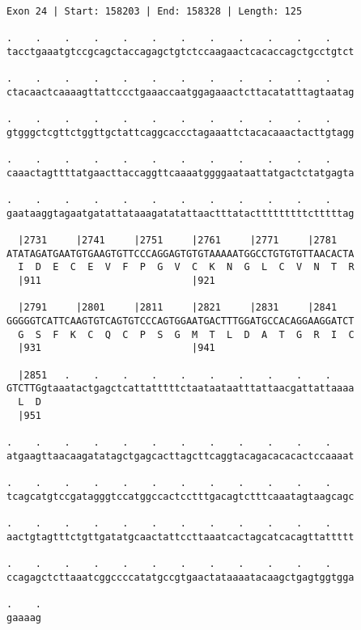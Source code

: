 \documentclass{article}
\begin{document}
\begin{Verbatim}[fontfamily=courier]
Exon 24 | Start: 158203 | End: 158328 | Length: 125

.    .    .    .    .    .    .    .    .    .    .    .    
tacctgaaatgtccgcagctaccagagctgtctccaagaactcacaccagctgcctgtct

.    .    .    .    .    .    .    .    .    .    .    .    
ctacaactcaaaagttattccctgaaaccaatggagaaactcttacatatttagtaatag

.    .    .    .    .    .    .    .    .    .    .    .    
gtgggctcgttctggttgctattcaggcaccctagaaattctacacaaactacttgtagg

.    .    .    .    .    .    .    .    .    .    .    .    
caaactagttttatgaacttaccaggttcaaaatggggaataattatgactctatgagta

.    .    .    .    .    .    .    .    .    .    .    .    
gaataaggtagaatgatattataaagatatattaactttatactttttttttctttttag

  |2731     |2741     |2751     |2761     |2771     |2781   
ATATAGATGAATGTGAAGTGTTCCCAGGAGTGTGTAAAAATGGCCTGTGTGTTAACACTA
  I  D  E  C  E  V  F  P  G  V  C  K  N  G  L  C  V  N  T  R
  |911                          |921                        

  |2791     |2801     |2811     |2821     |2831     |2841   
GGGGGTCATTCAAGTGTCAGTGTCCCAGTGGAATGACTTTGGATGCCACAGGAAGGATCT
  G  S  F  K  C  Q  C  P  S  G  M  T  L  D  A  T  G  R  I  C
  |931                          |941                        

  |2851   .    .    .    .    .    .    .    .    .    .    
GTCTTGgtaaatactgagctcattatttttctaataataatttattaacgattattaaaa
  L  D                                                      
  |951                                                      

.    .    .    .    .    .    .    .    .    .    .    .    
atgaagttaacaagatatagctgagcacttagcttcaggtacagacacacactccaaaat

.    .    .    .    .    .    .    .    .    .    .    .    
tcagcatgtccgatagggtccatggccactcctttgacagtctttcaaatagtaagcagc

.    .    .    .    .    .    .    .    .    .    .    .    
aactgtagtttctgttgatatgcaactattccttaaatcactagcatcacagttattttt

.    .    .    .    .    .    .    .    .    .    .    .    
ccagagctcttaaatcggccccatatgccgtgaactataaaatacaagctgagtggtgga

.    .
gaaaag
\end{Verbatim}
\newpage
\end{document}
